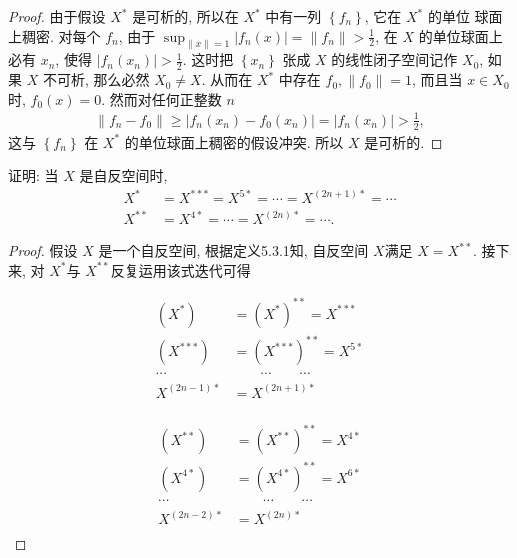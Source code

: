 \begin{proof}
    由于假设 $X^*$ 是可析的, 所以在 $X^*$ 中有一列 $\left\{f_n\right\}$, 它在 $X^*$ 的单位 球面上稠密. 对每个 $f_n$, 由于 $\sup _{\|x\|=1}\left|f_n(x)\right|=\left\|f_n\right\|>\frac{1}{2}$, 在 $X$ 的单位球面上必有 $x_n$, 使得 $\left|f_n\left(x_n\right)\right|>\frac{1}{2}$. 这时把 $\left\{x_n\right\}$ 张成 $X$ 的线性闭子空间记作 $X_0$, 如果 $X$ 不可析, 那么必然 $X_0 \neq X$. 从而在 $X^*$ 中存在 $f_0,\left\|f_0\right\|=1$, 而且当 $x \in X_0$ 时, $f_0(x)=0$. 然而对任何正整数 $n$
\begin{align*}
\left\|f_n-f_0\right\| \geqslant\left|f_n\left(x_n\right)-f_0\left(x_n\right)\right|=\left|f_n\left(x_n\right)\right|>\frac{1}{2},
\end{align*}
这与 $\left\{f_n\right\}$ 在 $X^*$ 的单位球面上稠密的假设冲突. 所以 $X$ 是可析的.
\end{proof}

\begin{example}
    证明: 当 $X$ 是自反空间时,
    \begin{align*}
        X^* &=X^{* * *}=X^{5 *}=\cdots=X^{(2 n+1) *}=\cdots\\ 
        X^{* *} &=X^{4 *}=\cdots=X^{(2 n) *}=\cdots.
    \end{align*}
\end{example}

\begin{proof}
    假设 $X$ 是一个自反空间, 根据定义5.3.1知, 自反空间 $X$满足 $X=X^{**}$. 接下来, 对 $X^*$与 $X^{**}$反复运用该式迭代可得

    \begin{minipage}[t]{.44\linewidth}
            \begin{align*}
        (X^*) &= (X^*)^{**}=X^{***}\\ 
        (X^{***}) &=(X^{***})^{**}=X^{5*}\\ 
        \cdots &\qquad\cdots\qquad\cdots\\ 
        X^{(2n-1)*} &=X^{(2n+1)*}\\ 
    \end{align*}
    \end{minipage}
    \begin{minipage}[t]{.44\linewidth}
            \begin{align*}
        (X^{**}) &= (X^{**})^{**}=X^{4*}\\ 
        (X^{4*}) &=(X^{4*})^{**}=X^{6*}\\ 
        \cdots &\qquad\cdots\qquad\cdots\\ 
        X^{(2n-2)*} &=X^{(2n)*}\\ 
    \end{align*}
    \end{minipage}
\end{proof}









